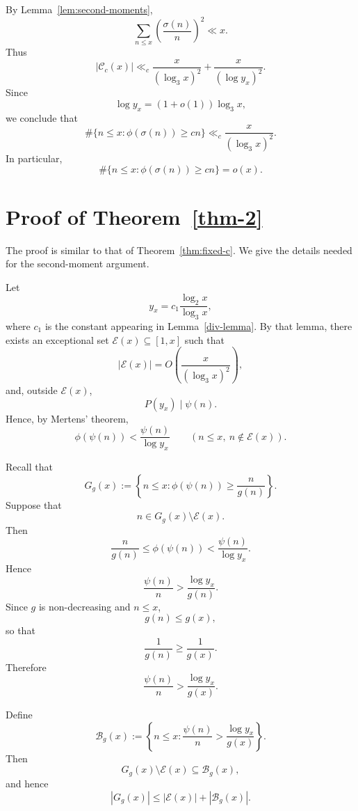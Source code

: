 \documentclass{article}
\theoremstyle{remark}
\begin{document}
By Lemma~\ref{lem:second-moments},
\[
        \sum_{n\le x}
        \left(\frac{\sigma(n)}n\right)^2
        \ll x.
\]
Thus
\[
        |\mathcal C_c(x)|
        \ll_c
        \frac{x}{(\log_3x)^2}
        +
        \frac{x}{(\log y_x)^2}.
\]
Since
\[
        \log y_x=(1+o(1))\log_3x,
\]
we conclude that
\[
        \#\{n\le x:\phi(\sigma(n))\ge cn\}
        \ll_c
        \frac{x}{(\log_3x)^2}.
\]
In particular,
\[
        \#\{n\le x:\phi(\sigma(n))\ge cn\}=o(x).
\]

\section{Proof of Theorem~\ref{thm-2}}

The proof is similar to that of Theorem~\ref{thm:fixed-c}.
We give the details needed for the second-moment argument.

Let
\[
        y_x=c_1\frac{\log_2x}{\log_3x},
\]
where \(c_1\) is the constant appearing in Lemma~\ref{div-lemma}.
By that lemma, there exists an exceptional set
\(\mathcal E(x)\subseteq[1,x]\) such that
\[
        |\mathcal E(x)|
        =
        O\left(\frac{x}{(\log_3x)^2}\right),
\]
and, outside \(\mathcal E(x)\),
\[
        P(y_x)\mid\psi(n).
\]
Hence, by Mertens' theorem,
\[
        \phi(\psi(n))
        <
        \frac{\psi(n)}{\log y_x}
        \qquad
        (n\le x,\ n\notin\mathcal E(x)).
\]

Recall that
\[
        G_g(x)
        :=
        \left\{
        n\le x:
        \phi(\psi(n))\geq\frac{n}{g(n)}
        \right\}.
\]
Suppose that
\[
        n\in G_g(x)\setminus\mathcal E(x).
\]
Then
\[
        \frac{n}{g(n)}
        \leq
        \phi(\psi(n))
        <
        \frac{\psi(n)}{\log y_x}.
\]
Hence
\[
        \frac{\psi(n)}n
        >
        \frac{\log y_x}{g(n)}.
\]
Since \(g\) is non-decreasing and \(n\le x\),
\[
        g(n)\le g(x),
\]
so that
\[
        \frac1{g(n)}
        \geq
        \frac1{g(x)}.
\]
Therefore
\[
        \frac{\psi(n)}n
        >
        \frac{\log y_x}{g(x)}.
\]

Define
\[
        \mathcal B_g(x)
        :=
        \left\{
        n\le x:
        \frac{\psi(n)}n
        >
        \frac{\log y_x}{g(x)}
        \right\}.
\]
Then
\[
        G_g(x)\setminus\mathcal E(x)
        \subseteq
        \mathcal B_g(x),
\]
and hence
\[
        |G_g(x)|
        \leq
        |\mathcal E(x)|
        +
        |\mathcal B_g(x)|.
\]
\end{document}

